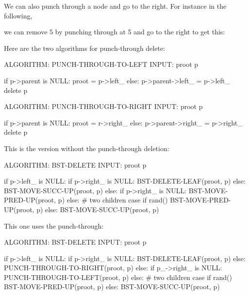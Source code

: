 We can also punch through a node and go to the right.
For instance in the following,

we can remove 5 by punching
through at 5 and go to the right to get this:

Here are the two algorithms for punch-through delete:
\begin{console}
ALGORITHM: PUNCH-THROUGH-TO-LEFT
INPUT: proot
       p

if p->parent is NULL:
    proot = p->left_
else:
    p->parent->left_ = p->left_
delete p
\end{console}
\begin{console}
ALGORITHM: PUNCH-THROUGH-TO-RIGHT
INPUT: proot
       p

if p->parent is NULL:
    proot = r->right_
else:
    p->parent->right_ = p->right_
delete p
\end{console}

This is the version without the punch-through deletion:
{\small
\begin{console}
ALGORITHM: BST-DELETE
INPUT: proot
       p

if p->left_ is NULL:
    if p->right_ is NULL:
        BST-DELETE-LEAF(proot, p)
    else:
        BST-MOVE-SUCC-UP(proot, p)
else:
    if p->right_ is NULL:
        BST-MOVE-PRED-UP(proot, p)
    else:
        # two children case
        if rand() %
            BST-MOVE-PRED-UP(proot, p)
        else:
            BST-MOVE-SUCC-UP(proot, p)
\end{console}
}
This one uses the punch-through:
{\small
\begin{console}
ALGORITHM: BST-DELETE
INPUT: proot
       p

if p->left_ is NULL:
    if p->right_ is NULL:
        BST-DELETE-LEAF(proot, p)
    else:
        PUNCH-THROUGH-TO-RIGHT(proot, p)
else:
    if p_->right_ is NULL:
        PUNCH-THROUGH-TO-LEFT(proot, p)
    else:
        # two children case
        if rand() %
            BST-MOVE-PRED-UP(proot, p)
        else:
            BST-MOVE-SUCC-UP(proot, p)
\end{console}
}

%
%



